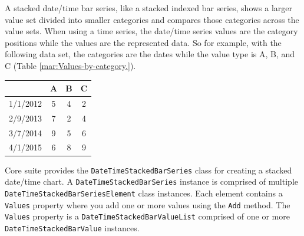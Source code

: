 \documentclass[american,letterpaper]{tufte-book}
\providecommand{\tabularnewline}{\\}
\numberwithin{equation}{section}
\numberwithin{figure}{section}
\begin{document}
{A stacked date/time bar series, like a stacked indexed bar series,
shows a larger value set divided into smaller categories and compares
those categories across the value sets. When using a time series,
the date/time series values are the category positions while the values
are the represented data. So for example, with the following data
set, the categories are the dates while the value type is A, B, and
C (Table \ref{mar:Values-by-category.}).
\begin{margintable}
\begin{tabular}{cccc}
\toprule 
 & A & B & C\tabularnewline
\midrule
1/1/2012 & 5 & 4 & 2\tabularnewline
2/9/2013 & 7 & 2 & 4\tabularnewline
3/7/2014 & 9 & 5 & 6\tabularnewline
4/1/2015 & 6 & 8 & 9\tabularnewline
\bottomrule
\end{tabular}

\medskip{}
\caption{Values by category.}\label{mar:Values-by-category.}

\end{margintable}

Core suite provides the \texttt{DateTimeStackedBarSeries} class for
creating a stacked date/time chart. A \texttt{DateTimeStackedBarSeries}
instance is comprised of multiple \texttt{DateTimeStackedBarSeriesElement}
class instances. Each element contains a \texttt{Values} property
where you add one or more values using the \texttt{Add} method. The
\texttt{Values} property is a \texttt{DateTimeStackedBarValueList}
comprised of one or more \texttt{DateTimeStackedBarValue} instances.

}
\end{document}
